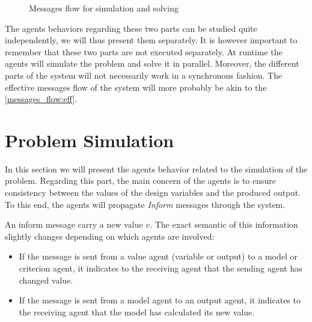 \begin{figure}[h]
	\hfill

	\centering
	
	\caption{Messages flow for simulation and solving}
	\label{messages_flow}

\end{figure}

The agents behaviors regarding these two parts can be studied quite independently, we will thus present them separately.  It is however important to remember that these two parts are not executed separately. At runtime the agents will simulate the problem and solve it in parallel. Moreover, the different parts of the system will not necessarily work in a synchronous fashion. The effective messages flow of the system will more probably be akin to the \figurename{} \ref{messages_flow:eff}.

\section{Problem Simulation}

In this section we will present the agents behavior related to the simulation of the problem. Regarding this part, the main concern of the agents is to ensure consistency between the values of the design variables and the produced output. To this end, the agents will propagate \emph{Inform} messages through the system.

An inform message carry a new value $v$. The exact semantic of this information slightly changes depending on which agents are involved:

\begin{itemize}
\item If the message is sent from a value agent (variable or output) to a model or criterion agent, it indicates to the receiving agent that the sending agent has changed value.

\item If the message is sent from a model agent to an output agent, it indicates to the receiving agent that the model has calculated its new value.
\end{itemize}

